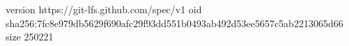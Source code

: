 version https://git-lfs.github.com/spec/v1
oid sha256:7fc8e979db5629f690afc29f93dd551b0493ab492d53ee5657c5ab2213065d66
size 250221
